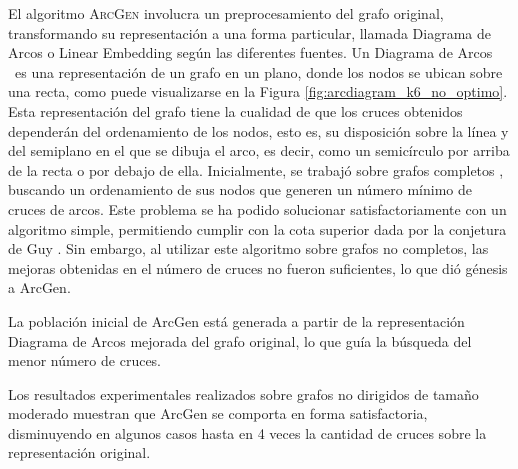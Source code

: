 	El algoritmo \textsc{ArcGen} involucra un preprocesamiento del grafo original,  transformando su representación a una  forma particular, llamada Diagrama de Arcos \cite{saaty1964minimum} o Linear Embedding \cite{masuda1990crossing} según las diferentes fuentes. Un Diagrama de Arcos \cite{Wat02,Nich68,saaty1964minimum}\ es una representación de  un grafo en un plano, donde los nodos se ubican sobre una recta, como puede visualizarse en la Figura \ref{fig:arcdiagram_k6_no_optimo}. Esta representación del grafo tiene la cualidad de %
	que los cruces obtenidos dependerán del ordenamiento de los nodos, esto es, su disposición sobre la línea y del  semiplano en el que se  dibuja el arco, es decir, como un semicírculo por arriba de la recta o por debajo de ella. %
	Inicialmente, se trabajó sobre grafos completos \cite{Aich02}, buscando un ordenamiento de sus nodos que generen un número mínimo de cruces de arcos.
	Este problema se ha podido solucionar satisfactoriamente con un algoritmo simple, permitiendo cumplir con la cota superior dada por la conjetura de Guy \cite{guy1960combinatorial}. %
	Sin embargo,  al utilizar este algoritmo sobre grafos no completos, las  mejoras obtenidas en el número de cruces no fueron suficientes, lo que dió génesis a {\sc ArcGen}.
	
	La  población inicial de {\sc ArcGen}  está generada a partir de la representación Diagrama de Arcos mejorada del  grafo original, lo que guía la búsqueda del menor número de cruces.%
	
	Los resultados experimentales realizados sobre grafos no dirigidos de tamaño moderado muestran que  {\sc ArcGen} se comporta en forma satisfactoria, disminuyendo en algunos casos hasta en 4 veces la cantidad de cruces sobre la representación original. 
	
